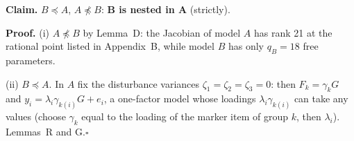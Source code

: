 \documentclass[10pt,a4paper]{article}
\newcommand{\nest}{\preceq}
\newcommand{\nnest}{\not\preceq}
\begin{document}
\par\bigskip
\noindent\textbf{Claim.} $B \nest A$, $A \nnest B$: \textbf{B is nested in A} (strictly).\par\smallskip
\noindent\textbf{Proof.} (i) $A\nnest B$ by Lemma~D: the Jacobian of model $A$ has rank 21 at the rational point listed in Appendix~B, while model $B$ has only $q_B=18$ free parameters.\par\smallskip
\noindent(ii) $B\nest A$. In $A$ fix the disturbance variances $\zeta_1=\zeta_2=\zeta_3=0$: then $F_k=\gamma_kG$ and $y_i=\lambda_i\gamma_{k(i)}G+e_i$, a one-factor model whose loadings $\lambda_i\gamma_{k(i)}$ can take any values (choose $\gamma_k$ equal to the loading of the marker item of group $k$, then $\lambda_i$). Lemmas~R and G.\hfill$\square$\par\medskip
{}

\clearpage
\end{document}
